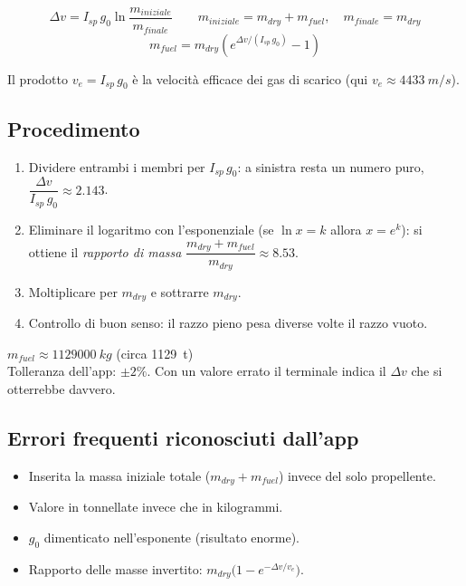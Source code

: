 \documentclass[11pt,a4paper]{article}
\newcommand{\dv}{\Delta v}
\begin{document}
\begin{formule}
\[
  \dv = I_{sp}\, g_0 \ln\frac{m_{iniziale}}{m_{finale}}
  \qquad m_{iniziale} = m_{dry} + m_{fuel},\quad m_{finale} = m_{dry}
\]
\[
  m_{fuel} = m_{dry}\left(e^{\dv/(I_{sp}\,g_0)} - 1\right)
\]
\end{formule}

Il prodotto $v_e = I_{sp}\,g_0$ è la velocità efficace dei gas di scarico (qui $v_e \approx \SI{4433}{m/s}$).

\subsection{Procedimento}
\begin{enumerate}
  \item Dividere entrambi i membri per $I_{sp}\,g_0$: a sinistra resta un numero puro,
        $\dfrac{\dv}{I_{sp}\,g_0} \approx \num{2.143}$.
  \item Eliminare il logaritmo con l'esponenziale (se $\ln x = k$ allora $x = e^k$): si ottiene il
        \emph{rapporto di massa} $\dfrac{m_{dry}+m_{fuel}}{m_{dry}} \approx \num{8.53}$.
  \item Moltiplicare per $m_{dry}$ e sottrarre $m_{dry}$.
  \item Controllo di buon senso: il razzo pieno pesa diverse volte il razzo vuoto.
\end{enumerate}

\begin{risultato}
$m_{fuel} \approx \SI{1129000}{kg}$ \; (circa \SI{1129}{t})\\[0.2em]
{\small Tolleranza dell'app: $\pm 2\%$. Con un valore errato il terminale indica il $\dv$ che si otterrebbe davvero.}
\end{risultato}

\subsection{Errori frequenti riconosciuti dall'app}
\begin{itemize}
  \item Inserita la massa iniziale totale ($m_{dry} + m_{fuel}$) invece del solo propellente.
  \item Valore in tonnellate invece che in kilogrammi.
  \item $g_0$ dimenticato nell'esponente (risultato enorme).
  \item Rapporto delle masse invertito: $m_{dry}\bigl(1 - e^{-\dv/v_e}\bigr)$.
\end{itemize}
\end{document}
